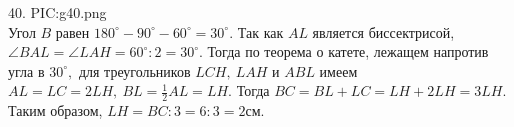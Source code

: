40. {{PIC:g40.png}}\\
Угол $B$ равен $180^\circ-90^\circ-60^\circ=30^\circ.$ Так как $AL$ является биссектрисой, $\angle BAL= \angle LAH=60^\circ:2=30^\circ.$ Тогда по теорема о катете, лежащем напротив угла в $30^\circ,$ для треугольников $LCH,\ LAH$ и $ABL$ имеем $AL=LC=2LH,\ BL=\frac{1}{2}AL=LH.$ Тогда $BC=BL+LC=LH+2LH=3LH.$ Таким образом, $LH=BC:3=6:3=2$см.\\
